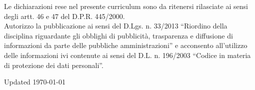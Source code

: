 \documentclass[10pt]{article}
\newcommand{\bottomcenter}[1]%
        {\hspace*{-\marginparsep minus \marginparwidth}%
         \begin{minipage}[t]{\textwidth+\marginparwidth+\marginparsep}%
\begin{center}
                {#1}\\[-0.15\baselineskip]%
\end{center}
         \end{minipage}}
\begin{document}
\vfill

\bottomcenter{
\begin{footnotesize}
Le dichiarazioni rese nel presente curriculum sono da ritenersi rilasciate ai sensi degli artt. 46 e 47 del D.P.R. 445/2000. \\
\medskip 
Autorizzo la pubblicazione ai sensi del D.Lgs. n. 33/2013 “Riordino della disciplina riguardante gli obblighi di pubblicità, trasparenza e diffusione di informazioni da parte delle pubbliche amministrazioni” e acconsento all’utilizzo delle informazioni ivi contenute ai sensi del D.L. n. 196/2003 “Codice in materia di protezione dei dati personali”. \\
\end{footnotesize}
\medskip
Updated \today}
\end{document}
